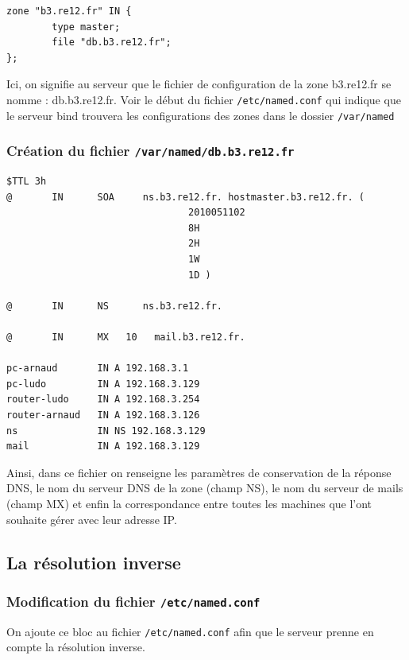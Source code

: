 \documentclass[12pt,a4paper,notitlepage]{article}
\begin{document}
\begin{lstlisting}[title=Lignes à ajouter]
zone "b3.re12.fr" IN {
        type master;
        file "db.b3.re12.fr";
};
\end{lstlisting}

Ici, on signifie au serveur que le fichier de configuration de la zone b3.re12.fr se nomme : db.b3.re12.fr. Voir le début du fichier \texttt{/etc/named.conf} qui indique que le serveur bind trouvera les configurations des zones dans le dossier \texttt{/var/named}

\subsubsection{Création du fichier \texttt{/var/named/db.b3.re12.fr}}

\begin{lstlisting}[title=Ensemble des paramètres de la zone]
$TTL 3h
@       IN      SOA     ns.b3.re12.fr. hostmaster.b3.re12.fr. (
                                2010051102
                                8H
                                2H
                                1W
                                1D )

@       IN      NS      ns.b3.re12.fr.

@       IN      MX   10   mail.b3.re12.fr.

pc-arnaud       IN A 192.168.3.1
pc-ludo         IN A 192.168.3.129
router-ludo     IN A 192.168.3.254
router-arnaud   IN A 192.168.3.126
ns              IN NS 192.168.3.129
mail            IN A 192.168.3.129
\end{lstlisting}

Ainsi, dans ce fichier on renseigne les paramètres de conservation de la réponse DNS,  le nom du serveur DNS de la zone (champ NS), le nom du serveur de mails (champ MX) et enfin la correspondance entre toutes les machines que l'ont souhaite gérer avec leur adresse IP. 

\clearpage
\subsection{La résolution inverse}

\subsubsection{Modification du fichier \texttt{/etc/named.conf}}

On ajoute ce bloc au fichier \texttt{/etc/named.conf} afin que le serveur prenne en compte la résolution inverse.
\end{document}
